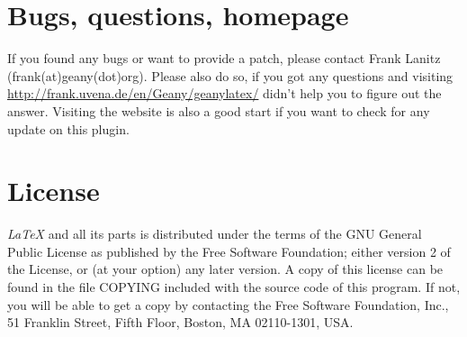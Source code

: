 \documentclass[%
paper=a4,%
fontsize=11pt,%
twoside=false,%
DIV18,%
headsepline,%
plainheadsepline,%
footsepline,%
plainfootsepline,%
bibliography=totoc,%
listof=totoc,%
BCOR10mm,%
parskip=half,%
openany,%
]{scrreprt}
\begin{document}
\chapter{Bugs, questions, homepage}
\label{contact}
If you found any bugs or want to provide a patch, please contact Frank
Lanitz (frank(at)geany(dot)org). Please also do so, if you got any
questions and visiting \\ \url{http://frank.uvena.de/en/Geany/geanylatex/}
didn't help you to figure out the answer. Visiting the website is also
a good start if you want to check for any update on this plugin.

\chapter{License}
\textit{LaTeX} and all its parts is distributed under the terms of the
GNU General Public License as published by the Free Software
Foundation; either version 2 of the License, or (at your option) any
later version. A copy of this license can be found in the file COPYING
included with the source code of this program. If not, you will be
able to get a copy by contacting the Free Software Foundation, Inc.,
51 Franklin Street, Fifth Floor, Boston, MA 02110-1301, USA.
\end{document}
